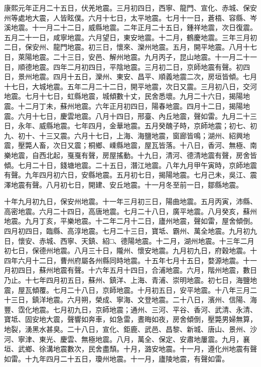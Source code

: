 \begin{pinyinscope}
康熙元年正月二十五日，伏羌地震。三月初四日，西寧、龍門、宣化、赤城、保安州等處地大震，人皆眩僕。六月十七日，太平地震。七月十一日，蒼梧、容縣、岑溪地震。十一月二十二日，威縣地震。二年正月二十五日，鍾祥地震，次日復震。五月二十一日，咸寧地震。六月望日，東安地震。十二月，鶴慶地震。三年三月初二日，保安州、龍門地震。初三日，懷來、灤州地震。五月，開平地震。八月十七日，萊陽地震。二十三日，安邑、解州地震。九月丙子，昆山地震。十一月二十一日，順德地震。四年二月初四日，平陰地震。三月初二日，京師地震有聲。初四日，景州地震。四月十五日，灤州、東安、昌平、順義地震二次，房垣皆傾。七月十七日，大城地震。五年二月二十二日，開平地震，次日又震。三月初八日，交河地震。七月十七日，虹縣地震，城傾數十丈，民舍悉壞。九月二十六日，揭陽地震。十二月丁未，蘇州地震。六年正月初四日，陽春地震。四月十二日，揭陽地震。六月十七日，慶雲地震。八月十四日，邢臺、內丘地震，聲如雷。九月二十三日，永年、威縣地震。七年四月，金華地震。五月癸醜子時，京師地震；初七、初九、初十、十三又震。六月十七日，上海、海鹽地震，窗廊皆鳴；湖州、紹興地震，壓斃人畜，次日又震；桐鄉、嵊縣地震，屋瓦皆落。十八日，香河、無極、南樂地震，自西北起，戛戛有聲，房屋搖動。十九日，清河、德清地震有聲，房舍皆傾。七月二十日，錢塘地震。二十五日，潛江地震。八年九月甲午寅時，京師地震有聲。九年四月初六日，安縣地震。五月初七日，揭陽地震。七月己未，吳江、震澤地震有聲。八月初七日，開建、安丘地震。十一月冬至前一日，鄒縣地震。

十年九月初九日，保安州地震。十一年三月初三日，陽曲地震。五月丙寅，沛縣、高密地震。六月二十四日，高唐地震。七月二十八日，廣平地震。八月癸亥，蘇州地震。九月丁亥，平樂地震。十二年二月十二日，廬州地震，聲如雷，屋舍傾倒。四月初四日，臨縣、高淳地震。七月二十三日，寶坻、霸州、萬全地震。九月初九日，懷安、赤城、西寧、天鎮、紹□、德陽地震。十二月，湖州地震。十三年二月初七日，保德州地震。八月三十日，隴州、懷安地震。九月初九日，府穀地震。十四年六月十二日，曹州府屬各州縣同時地震。十五年七月十五日，婺源地震。十一月初四日，蘇州地震有聲。十六年五月十四日，合浦地震。六月，階州地震，數日乃止。十七年四月初五日，蘇州、鎮洋、上海、青浦、崇明地震。初七日，海鹽地震，屋瓦傾覆。七月二十八日，京師地震。十月初五日，安平地震。十八年三月二十三日，鎮洋地震。六月朔，榮成、寧海、文登地震。二十八日，濱州、信陽、海豐、霑化地震。七月初九日，京師地震；通州、三河、平谷、香河、武清、永清、寶坻、固安地大震，聲響如奔車，如急雷，晝晦如夜，房舍傾倒，壓斃男婦無算，地裂，湧黑水甚臭。二十八日，宣化、鉅鹿、武邑、昌黎、新城、唐山、景州、沙河、寧津、東光、慶雲、無極地震。八月，萬全、保定、安肅地屢震。九月，襄垣、武鄉、徐溝地震數次，民舍盡頹。十月，潞安地震。十一月，遵化州地震有聲如雷。十九年四月二十五日，瓊州地震。十一月，廬陵地震，有聲如雷。


\end{pinyinscope}

